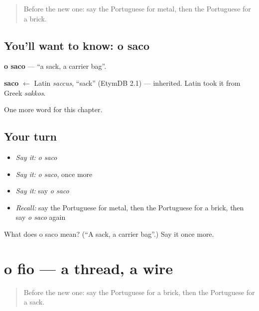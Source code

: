 \label{lesson:PT-C165-saco}



\begin{quote}
Before the new one: say the Portuguese for metal, then the Portuguese for a brick.
\end{quote}

\subsection*{You'll want to know: o saco}
\textbf{o saco} — \textquotedblleft{}a sack, a carrier bag\textquotedblright{}.

\begin{cousinweb}
\textbf{saco} $\leftarrow$ Latin \emph{saccus}, \textquotedblleft{}sack\textquotedblright{} (EtymDB 2.1) — inherited. Latin took it from Greek \emph{sakkos}.
\end{cousinweb}

\begin{grammarlens}[title={What you've built}]
One more word for this chapter.
\end{grammarlens}

\subsection*{Your turn}
\begin{itemize}
\raggedright
  \item \emph{Say it:} \emph{o saco}
  \item \emph{Say it:} \emph{o saco}, once more
  \item \emph{Say it:} say \emph{o saco}
  \item \emph{Recall:} say the Portuguese for metal, then the Portuguese for a brick, then say \emph{o saco} again
\end{itemize}

\begin{tcolorbox}[breakable,colback=teal!4,colframe=teal!35!black,title={Before you move on}]
What does o saco mean? (\textquotedblleft{}A sack, a carrier bag\textquotedblright{}.) Say it once more.
\end{tcolorbox}
\section[o fio]{o fio — a thread, a wire}

\label{lesson:PT-C165-fio}



\begin{quote}
Before the new one: say the Portuguese for a brick, then the Portuguese for a sack.
\end{quote}

